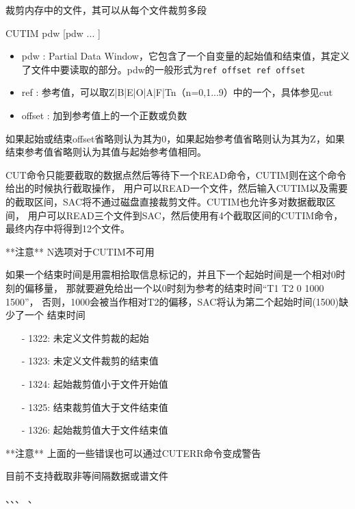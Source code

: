 \label{cmd:cutim}

裁剪内存中的文件，其可以从每个文件裁剪多段

\begin{SACSTX}
CUTIM pdw [pdw ... ]
\end{SACSTX}

\begin{itemize}
    \item pdw : Partial Data Window，它包含了一个自变量的起始值和结束值，其定义了文件中要读取的部分。pdw的一般形式为\lstinline{ref offset ref offset}
\item ref : 参考值，可以取Z|B|E|O|A|F|Tn（n=0,1...9）中的一个，具体参见cut
\item offset : 加到参考值上的一个正数或负数 
\end{itemize}

如果起始或结束offset省略则认为其为0，如果起始参考值省略则认为其为Z，如果结束参考值省略则认为其值与起始参考值相同。

CUT命令只能要截取的数据点然后等待下一个READ命令，CUTIM则在这个命令给出的时候执行截取操作，
用户可以READ一个文件，然后输入CUTIM以及需要的截取区间，SAC将不通过磁盘直接裁剪文件。CUTIM也允许多对数据截取区间，
用户可以READ三个文件到SAC，然后使用有4个截取区间的CUTIM命令，最终内存中将得到12个文件。

**注意**  N选项对于CUTIM不可用

如果一个结束时间是用震相拾取信息标记的，并且下一个起始时间是一个相对0时刻的偏移量，
那就要避免给出一个以0时刻为参考的结束时间``T1 T2 0 1000 1500''，
否则，1000会被当作相对T2的偏移，SAC将认为第二个起始时间(1500)缺少了一个	结束时间

\begin{itemize}
\item[-]1322: 未定义文件剪裁的起始
\item[-]1323: 未定义文件裁剪的结束值
\item[-]1324: 起始裁剪值小于文件开始值
\item[-]1325: 结束裁剪值大于文件结束值
\item[-]1326: 起始裁剪值大于文件结束值
\end{itemize}

**注意** 上面的一些错误也可以通过CUTERR命令变成警告

目前不支持截取非等间隔数据或谱文件

、、、
、
